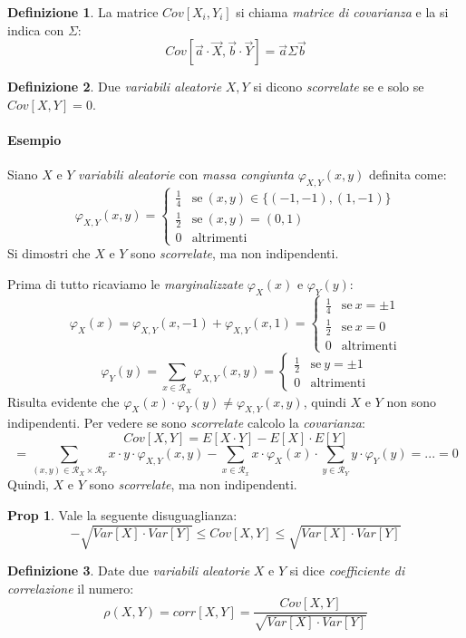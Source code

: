 \documentclass[12pt, a4paper]{report}
\theoremstyle{definition}
\newtheorem{definition}{Definizione}[section]
\newtheorem*{proposition}{Prop}
\DeclareRobustCommand{\supp}{\mathcal{R}}%
\begin{document}
\begin{definition}
	La matrice \(Cov[X_i,Y_i]\) si chiama \emph{matrice di covarianza} e la si
	indica con $\Sigma$:
	\[Cov[\overrightarrow{a}\cdot \overrightarrow{X},\overrightarrow{b}\cdot \overrightarrow{Y}]
	=\overrightarrow{a}\Sigma\overrightarrow{b}\]
\end{definition}

\begin{definition}
	Due \emph{variabili aleatorie} $X,Y$ si dicono \emph{scorrelate} se e solo
	se \(Cov[X,Y]=0\).
\end{definition}

\paragraph*{Esempio}
Siano $X$ e $Y$ \emph{variabili aleatorie} con \emph{massa congiunta} $\varphi_
{X,Y}(x,y)$ definita come:
\[\varphi_{X,Y}(x,y)=\begin{cases}
	{\frac{1}{4}} & \text{se}\ {(x,y)\in\{(-1,-1),(1,-1)\}}\\
	{\frac{1}{2}} & \text{se}\ {(x,y)=(0,1)}\\
	{0} & \text{altrimenti}
\end{cases}\]
Si dimostri che $X$ e $Y$ sono \emph{scorrelate}, ma non indipendenti.

Prima di tutto ricaviamo le \emph{marginalizzate} $\varphi_X(x)$ e $\varphi_Y(y)$:
\[\varphi_X(x)=\varphi_{X,Y}(x,-1)+\varphi_{X,Y}(x,1)=\begin{cases}
	{\frac{1}{4}} & \text{se}\ {x=\pm 1}\\
	{\frac{1}{2}} & \text{se}\ {x=0}\\
	{0} & \text{altrimenti}
\end{cases}\]
\[\varphi_Y(y)=\sum_{x\in\supp_X}\varphi_{X,Y}(x,y)=\begin{cases}
	{\frac{1}{2}} & \text{se}\ {y=\pm 1}\\
	{0} & \text{altrimenti}
\end{cases}\]
Risulta evidente che \(\varphi_X(x)\cdot \varphi_Y(y)\neq\varphi_{X,Y}(x,y)\), quindi
$X$ e $Y$ non sono indipendenti.
Per vedere se sono \emph{scorrelate} calcolo la \emph{covarianza}:
\[Cov[X,Y]=E[X\cdot Y]-E[X]\cdot E[Y]\]
\[=\sum_{(x,y)\in\supp_X\times\supp_Y}x\cdot y\cdot \varphi_{X,Y}(x,y)-\sum_{x\in\supp_x}
x\cdot \varphi_X(x)\cdot \sum_{y\in\supp_Y}y\cdot \varphi_Y(y)=...=0\]
Quindi, $X$ e $Y$ sono \emph{scorrelate}, ma non indipendenti.

\begin{proposition}
	Vale la seguente disuguaglianza:
	\[-\sqrt{Var[X]\cdot Var[Y]}\leq Cov[X,Y]\leq\sqrt{Var[X]\cdot Var[Y]}\]
\end{proposition}
\begin{definition}
	Date due \emph{variabili aleatorie} $X$ e $Y$ si dice \emph{coefficiente di
	correlazione} il numero:
	\[\rho(X,Y)=corr[X,Y]=\frac{Cov[X,Y]}{\sqrt{Var[X]\cdot Var[Y]}}\]
\end{definition}
\end{document}

